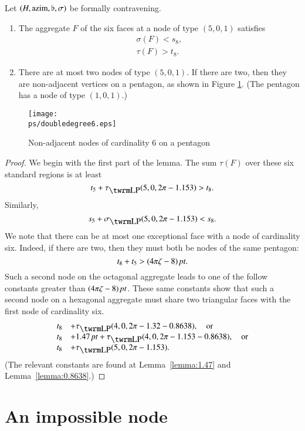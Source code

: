 \begin{lemma}
    \label{lemma:aggregate6}
    Let $(H,{\operatorname{azim}},\flat,\sigma)$ be formally contravening.
    \begin{enumerate}
    \item The aggregate $F$ of the six faces at a node of type
    $(5,0,1)$ satisfies
            $$
            \begin{array}{lll}
            \sigma(F) < s_8,\\
            \tau(F) > t_8.
            \end{array}
            $$
    \item There are at most two nodes of type $(5,0,1)$.  If
        there are two, then they are non-adjacent vertices on a
        pentagon, as shown in Figure \ref{fig:doubledegree6}.  (The
        pentagon has a node of type $(1,0,1)$.)
    \end{enumerate}
\end{lemma}
\begin{figure}[htb]
  \centering
  \texttt{[image: \\ps/doubledegree6.eps]}
  \caption{Non-adjacent nodes of cardinality $6$ on a pentagon}
  \label{fig:doubledegree6}
\end{figure}

\begin{proof}
We begin with the first part of the lemma. The sum  $\tau(F)$ over
these six standard regions is at least
    $$t_5+\tauLP(5,0,2\pi-1.153)> t_8.$$
Similarly,
    $$s_5+\sLP(5,0,2\pi-1.153)<s_8.$$
%
We note that there can be at most one exceptional face with a node
of cardinality six.  Indeed, if there are two, then they must both
be nodes of the same pentagon:
    $$t_8+t_5>(4\pi\zeta-8)\,\hbox{\it pt}.$$
Such a second node on the octagonal aggregate leads to one of the
follow constants greater than $(4\pi\zeta-8)\,\hbox{\it pt}$.  These same constants
show that such a second node on a hexagonal aggregate must share two
triangular faces with the first node of cardinality six.
$$\begin{array}{lll}
    t_8 &+\tauLP(4,0,2\pi-1.32-0.8638),\quad\text{or}\\
    t_8 &+1.47\,\pt+\tauLP(4,0,2\pi-1.153-0.8638),\quad\text{or}\\
    t_8 &+\tauLP(5,0,2\pi-1.153) .
\end{array}
$$
(The relevant constants are found at Lemma~\ref{lemma:1.47} and
Lemma~\ref{lemma:0.8638}.)
\end{proof}

\section{An impossible node}
\label{sec:impossible}

